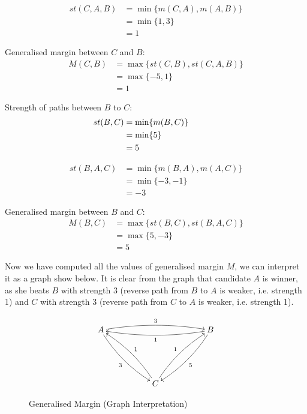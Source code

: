 \begin{align}
st (C, A, B)&= \min \lbrace m (C, A), m (A, B) \rbrace  \nonumber \\
                     &= \min \lbrace 1, 3\rbrace \nonumber \\
                     &= 1\nonumber
\end{align}

\noindent 
Generalised margin between $C$ and $B$:
\begin{align}
M (C, B)&=  \max \lbrace st (C, B), st(C, A, B) \rbrace \nonumber \\
                     &= \max \lbrace -5, 1 \rbrace \nonumber \\
                     &= 1\nonumber
\end{align}

\noident
Strength of paths between $B$ to $C$:
\begin{align}
\hspace{-3cm} st (B, C)&=  \min \lbrace m (B, C) \rbrace  \nonumber \\
					  &= \min \lbrace 5 \rbrace  \nonumber \\
                     &= 5 \nonumber
\end{align}


\begin{align}
st (B, A, C)&= \min \lbrace m (B, A), m (A, C) \rbrace  \nonumber \\
                     &= \min \lbrace -3, -1\rbrace \nonumber \\
                     &= -3\nonumber
\end{align}

\noindent 
Generalised margin between $B$ and $C$:
\begin{align}
M (B, C)&=  \max \lbrace st (B, C), st(B, A, C) \rbrace \nonumber \\
                     &= \max \lbrace 5, -3 \rbrace \nonumber \\
                     &= 5\nonumber
\end{align}

\noindent
Now we have computed all the values of generalised margin $M$, we can interpret it as a
graph show below.  It is clear from the graph that candidate $A$ is winner, as she beats 
$B$ with strength 3 (reverse path from $B$ to $A$ is weaker, i.e. strength 1) and 
$C$ with strength 3 (reverse path from $C$ to $A$ is weaker, i.e. strength 1). 

\begin{figure}[h] 
\[
 \xymatrix@R=12ex@C=12ex{
A \ar@/^/[rr]^{3} \ar@/_/[dr]_{3} & & B \ar@/^/[ll]^{1}
\ar@/^/[dl]^5 \\
& C \ar@/_/[ul]_{1} \ar@/^/[ur]^{1}
}\]
\caption{Generalised Margin (Graph Interpretation)}\label{generalisemargin}
\end{figure}
	 
